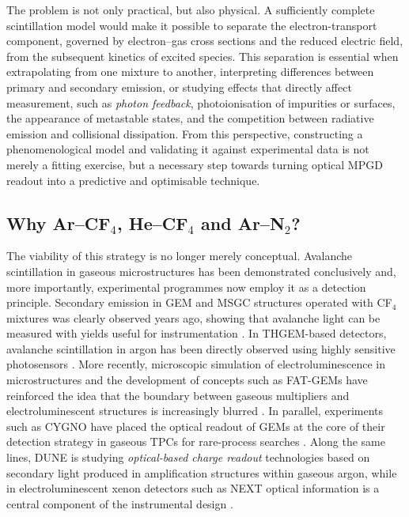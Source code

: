 \documentclass[12pt,a4paper]{article}
\begin{document}
The problem is not only practical, but also physical. A sufficiently complete scintillation model would make it possible to separate the electron-transport component, governed by electron--gas cross sections and the reduced electric field, from the subsequent kinetics of excited species. This separation is essential when extrapolating from one mixture to another, interpreting differences between primary and secondary emission, or studying effects that directly affect measurement, such as \textit{photon feedback}, photoionisation of impurities or surfaces, the appearance of metastable states, and the competition between radiative emission and collisional dissipation. From this perspective, constructing a phenomenological model and validating it against experimental data is not merely a fitting exercise, but a necessary step towards turning optical MPGD readout into a predictive and optimisable technique.

\subsection{Why Ar--CF$_4$, He--CF$_4$ and Ar--N$_2$?}

The viability of this strategy is no longer merely conceptual. Avalanche scintillation in gaseous microstructures has been demonstrated conclusively and, more importantly, experimental programmes now employ it as a detection principle. Secondary emission in GEM and MSGC structures operated with CF$_4$ mixtures was clearly observed years ago, showing that avalanche light can be measured with yields useful for instrumentation \cite{fraga2003the,morozov2012secondary}. In THGEM-based detectors, avalanche scintillation in argon has been directly observed using highly sensitive photosensors \cite{bondara2010direct}. More recently, microscopic simulation of electroluminescence in microstructures and the development of concepts such as FAT-GEMs have reinforced the idea that the boundary between gaseous multipliers and electroluminescent structures is increasingly blurred \cite{oliveira2012simulation,williams2024fatgems}. In parallel, experiments such as CYGNO have placed the optical readout of GEMs at the core of their detection strategy in gaseous TPCs for rare-process searches \cite{torelli2022the}. Along the same lines, DUNE is studying \emph{optical-based charge readout} technologies based on secondary light produced in amplification structures within gaseous argon, while in electroluminescent xenon detectors such as NEXT optical information is a central component of the instrumental design \cite{hayrapetyan2024dune,next2014present}.
\end{document}
